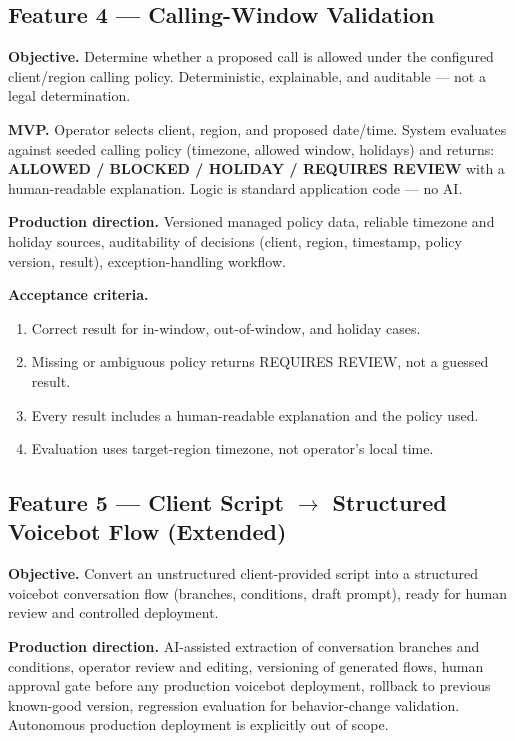 \documentclass[11pt,a4paper]{article}
\begin{document}
\subsection{Feature 4 — Calling-Window Validation}

\textbf{Objective.} Determine whether a proposed call is allowed under the configured client/region calling policy. Deterministic, explainable, and auditable — not a legal determination.

\textbf{MVP.} Operator selects client, region, and proposed date/time. System evaluates against seeded calling policy (timezone, allowed window, holidays) and returns: \textbf{ALLOWED / BLOCKED / HOLIDAY / REQUIRES REVIEW} with a human-readable explanation. Logic is standard application code — no AI.

\textbf{Production direction.} Versioned managed policy data, reliable timezone and holiday sources, auditability of decisions (client, region, timestamp, policy version, result), exception-handling workflow.

\textbf{Acceptance criteria.}
\begin{enumerate}
  \item Correct result for in-window, out-of-window, and holiday cases.
  \item Missing or ambiguous policy returns REQUIRES REVIEW, not a guessed result.
  \item Every result includes a human-readable explanation and the policy used.
  \item Evaluation uses target-region timezone, not operator's local time.
\end{enumerate}

\subsection{Feature 5 --- Client Script \texorpdfstring{$\rightarrow$}{->} Structured Voicebot Flow \textnormal{(Extended)}}

\textbf{Objective.} Convert an unstructured client-provided script into a structured voicebot conversation flow (branches, conditions, draft prompt), ready for human review and controlled deployment.

\textbf{Production direction.} AI-assisted extraction of conversation branches and conditions, operator review and editing, versioning of generated flows, human approval gate before any production voicebot deployment, rollback to previous known-good version, regression evaluation for behavior-change validation. Autonomous production deployment is explicitly out of scope.
\end{document}
